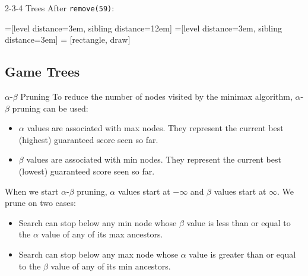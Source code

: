 \documentclass[9pt]{beamer}
\begin{document}
\begin{frame}[fragile]{2-3-4 Trees}
  After {\tt remove(59)}:

  =[level distance=3em, sibling distance=12em]
  =[level distance=3em, sibling distance=3em]
   = [rectangle, draw]

  \pause
  \vspace{1em}
\end{frame}

\subsection{Game Trees}
\begin{frame}[fragile]{$\alpha$-$\beta$ Pruning}
  To reduce the number of nodes visited by the minimax algorithm,
  $\alpha$-$\beta$ pruning can be used:

  \begin{itemize}
    \pause
    \item
      $\alpha$ values are associated with {\sc max} nodes. They represent
      the current best (highest) guaranteed score seen so far.
    \pause
    \item
      $\beta$ values are associated with {\sc min} nodes. They represent the
      current best (lowest) guaranteed score seen so far.
  \end{itemize}

  \pause
  When we start $\alpha$-$\beta$ pruning, $\alpha$ values start at $-\infty$
  and $\beta$ values start at $\infty$. We prune on two cases:

  \begin{itemize}
    \pause
    \item
      Search can stop below any {\sc min} node whose $\beta$ value is less
      than or equal to the $\alpha$ value of any of its {\sc max} ancestors.
    \pause
    \item
      Search can stop below any {\sc max} node whose $\alpha$ value is
      greater than or equal to the $\beta$ value of any of its {\sc min}
      ancestors.
  \end{itemize}
\end{frame}
\end{document}
